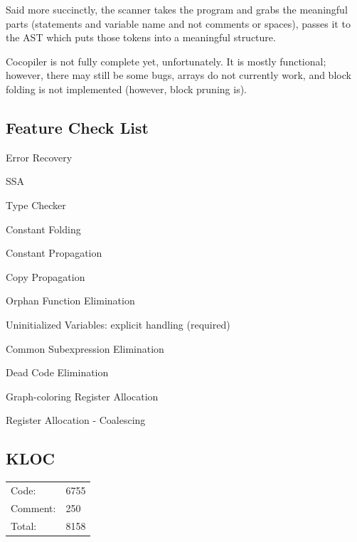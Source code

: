 \documentclass{tamureport}
\newcommand{\cmark}{\ding{51}}%
\newcommand{\xmark}{\ding{55}}%
\begin{document}
Said more succinctly, the scanner takes the program and grabs the meaningful parts (statements and variable name and not comments or spaces), passes it to the AST which puts those tokens into a meaningful structure. 

Cocopiler is not fully complete yet, unfortunately. It is mostly functional; however, there may still be some bugs, arrays do not currently work, and block folding is not implemented (however, block pruning is). 

\subsection*{Feature Check List}
\begin{todolist}
    \item Error Recovery
    \item[\xmark] SSA
    \item[\cmark] Type Checker
    \item[\cmark] Constant Folding
    \item[\cmark] Constant Propagation
    \item[\cmark] Copy Propagation 
    \item[\cmark] Orphan Function Elimination
    \item[\cmark] Uninitialized Variables: explicit handling (required)
    \item[\cmark] Common Subexpression Elimination
    \item[\cmark] Dead Code Elimination
    \item[\cmark] Graph-coloring Register Allocation
    \item[\xmark] Register Allocation - Coalescing
\end{todolist}

\vspace{2em}
{
\subsection*{KLOC}
\large
\begin{tabular}{p{3.5cm}l}
    Code: & 6755\\
    Comment: & 250\\
    Total: & 8158 
\end{tabular}
}

\vspace{2em}

% 










\end{document}
